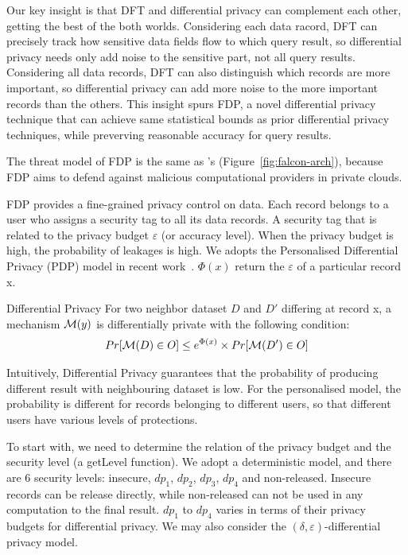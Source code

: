 Our key insight is that DFT and differential privacy can complement each other, 
getting the best of the both worlds. Considering each data racord, DFT can 
precisely track how sensitive data fields flow to which query result, so 
differential privacy needs only add noise to the sensitive part, not all query 
results. Considering all data records, DFT can also distinguish which records 
are more important, so differential privacy can add more noise to the more 
important records than the others. This insight spurs FDP, a novel differential 
privacy technique that can achieve same statistical bounds as prior 
differential privacy techniques, while preverving reasonable accuracy for query 
results.


The threat model of FDP is the same as \kakute's 
(Figure~\ref{fig:falcon-arch}), because FDP aims to defend against malicious 
computational providers in private clouds. 

FDP provides a fine-grained privacy control on data. Each record
belongs to a user who assigns a security tag to all its data records.
A security tag that is related to the privacy budget $\varepsilon$ (or accuracy 
level).
When the privacy budget is high, the probability of leakages is high.
We adopts the Personalised Differential Privacy (PDP) model in recent
work~\cite{pdp:icde15}. $\Phi(x)$ return the $\varepsilon$ of a particular 
record x.

\begin{definition}{Differential Privacy}
For two neighbor dataset $D$ and $D'$ differing at record x,
a mechanism ${\cal M}(y)$ is differentially private with the following 
condition:
\begin{align}
Pr[{\cal M}(D) \in O] \leq e^{\Phi(x)} \times Pr[{\cal M}(D') \in O]
\end{align}
\end{definition}

Intuitively, Differential Privacy guarantees that the probability of
producing different result with neighbouring dataset is low. For the 
personalised model, the probability is different for records belonging to 
different users, so that different users have various levels of protections.

To start with, we need to determine the relation of the privacy budget and the 
security
level (a getLevel function).
We adopt a deterministic model, and there are 6 security levels: insecure, 
$dp_1$,
$dp_2$, $dp_3$, $dp_4$ and non-released. Insecure records can be release 
directly,
while non-released can not be used in
any computation to the final result. $dp_1$ to $dp_4$ varies in terms of their
privacy budgets for differential privacy.
We may also consider the $(\delta, \varepsilon)$-differential privacy model.

